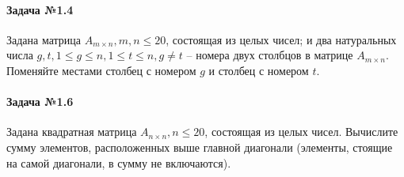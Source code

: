 \documentclass[12pt,a4paper]{report}
\begin{document}
\paragraph*{Задача №1.4}
Задана матрица $A_{m \times n}, m, n \le 20$, состоящая из целых чисел; и два натуральных числа $g, t, 1 \le g \le n, 1 \le t \le n, g \ne t$ -- номера двух столбцов в матрице $A_{m \times n}$. Поменяйте местами столбец с номером $g$ и столбец с номером $t$.

\paragraph*{Задача №1.6}
Задана квадратная матрица $A_{n \times n}, n \le 20$, состоящая из целых чисел. Вычислите сумму элементов, расположенных выше главной диагонали (элементы, стоящие на самой диагонали, в сумму не включаются).
\end{document}
